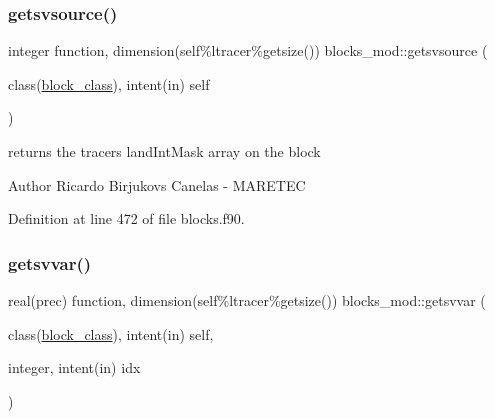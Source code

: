 \subsubsection{\texorpdfstring{getsvsource()}{getsvsource()}}
{\footnotesize\ttfamily integer function, dimension(self\%ltracer\%getsize()) blocks\+\_\+mod\+::getsvsource (\begin{DoxyParamCaption}\item[{class(\mbox{\hyperlink{structblocks__mod_1_1block__class}{block\+\_\+class}}), intent(in)}]{self }\end{DoxyParamCaption})\hspace{0.3cm}{\ttfamily [private]}}



returns the tracers land\+Int\+Mask array on the block 

\begin{DoxyAuthor}{Author}
Ricardo Birjukovs Canelas -\/ M\+A\+R\+E\+T\+EC 
\end{DoxyAuthor}


Definition at line 472 of file blocks.\+f90.


\mbox{\label{namespaceblocks__mod_a569c8a4a94791d4c0c24697b351ca8f2}} 
\subsubsection{\texorpdfstring{getsvvar()}{getsvvar()}}
{\footnotesize\ttfamily real(prec) function, dimension(self\%ltracer\%getsize()) blocks\+\_\+mod\+::getsvvar (\begin{DoxyParamCaption}\item[{class(\mbox{\hyperlink{structblocks__mod_1_1block__class}{block\+\_\+class}}), intent(in)}]{self,  }\item[{integer, intent(in)}]{idx }\end{DoxyParamCaption})\hspace{0.3cm}{\ttfamily [private]}}



